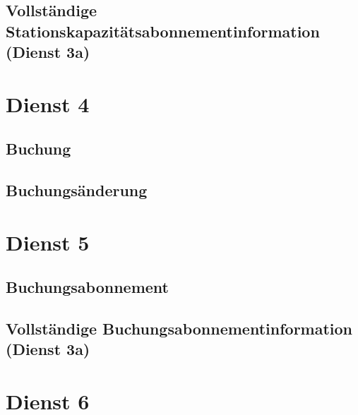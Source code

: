 \subsection*{Vollständige Stationskapazitätsabonnementinformation (Dienst 3a)}
\label{subsec:Nachrichten:Dienst3:CompleteAvailability}




\section{Dienst 4}
\label{subsec:Nachrichten:Dienst4}

\subsection*{Buchung}
\label{subsec:Nachrichten:Dienst4:Booking}



\subsection*{Buchungsänderung}
\label{subsec:Nachrichten:Dienst4:ChangeBooking}




\section{Dienst 5}
\label{subsec:Nachrichten:Dienst5}

\subsection*{Buchungsabonnement}
\label{subsec:Nachrichten:Dienst5:BookingAlertSubscription}




\subsection*{Vollständige Buchungsabonnementinformation (Dienst 3a)}
\label{subsec:Nachrichten:Dienst5:CompleteBookingAlert}



\section{Dienst 6}
\label{subsec:Nachrichten:Dienst6}

